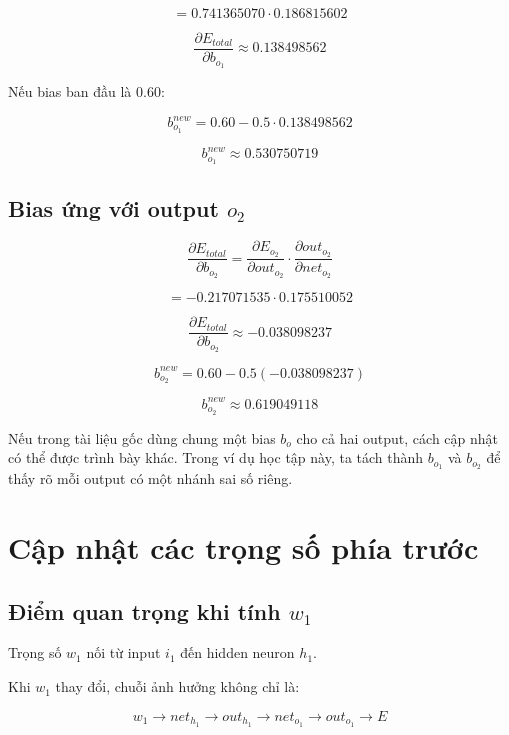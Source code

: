 \[
    =
    0.741365070
    \cdot
    0.186815602
\]

\[
    \frac{\partial E_{total}}{\partial b_{o_1}}
    \approx 0.138498562
\]

Nếu bias ban đầu là $0.60$:

\[
    b_{o_1}^{new}
    =
    0.60
    -
    0.5\cdot 0.138498562
\]

\[
    b_{o_1}^{new}
    \approx 0.530750719
\]

\subsection{Bias ứng với output $o_2$}

\[
    \frac{\partial E_{total}}{\partial b_{o_2}}
    =
    \frac{\partial E_{o_2}}{\partial out_{o_2}}
    \cdot
    \frac{\partial out_{o_2}}{\partial net_{o_2}}
\]

\[
    =
    -0.217071535
    \cdot
    0.175510052
\]

\[
    \frac{\partial E_{total}}{\partial b_{o_2}}
    \approx -0.038098237
\]

\[
    b_{o_2}^{new}
    =
    0.60
    -
    0.5(-0.038098237)
\]

\[
    b_{o_2}^{new}
    \approx 0.619049118
\]

\begin{luuy}
Nếu trong tài liệu gốc dùng chung một bias $b_o$ cho cả hai output, cách cập nhật có thể được trình bày khác. Trong ví dụ học tập này, ta tách thành $b_{o_1}$ và $b_{o_2}$ để thấy rõ mỗi output có một nhánh sai số riêng.
\end{luuy}

\section{Cập nhật các trọng số phía trước}

\subsection{Điểm quan trọng khi tính $w_1$}

Trọng số $w_1$ nối từ input $i_1$ đến hidden neuron $h_1$.

Khi $w_1$ thay đổi, chuỗi ảnh hưởng không chỉ là:

\[
    w_1
    \rightarrow
    net_{h_1}
    \rightarrow
    out_{h_1}
    \rightarrow
    net_{o_1}
    \rightarrow
    out_{o_1}
    \rightarrow
    E
\]

